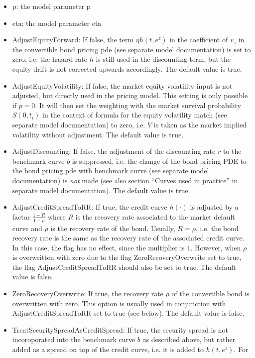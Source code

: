 \begin{itemize}
\item p: the model parameter p
\item eta: the model parameter eta
\item AdjustEquityForward: If false, the term $\eta h(t,e^z)$ in the coefficient of $v_z$ in the convertible bond
  pricing pde (see separate model documentation) is set to zero, i.e. the hazard rate $h$ is still used in the
  discounting term, but the equity drift is not corrected upwards accordingly. The default value is true.
\item AdjustEquityVolatility: If false, the market equity volatility input is not adjusted, but directly used in the
  pricing model. This setting is only possible if $p=0$. It will then set the weighting with the market survival
  probability $S(0,t_i)$ in the context of formula for the equity volatility match (see separate model documentation) to
  zero, i.e. $V$ is taken as the market implied volatility without adjustment. The default value is true.
\item AdjustDiscounting: If false, the adjustment of the discounting rate $r$ to the benchmark curve $b$ is suppressed,
  i.e. the change of the bond pricing PDE to the bond pricing pde with benchmark curve (see separate model
  documentation) is {\em not} made (see also section ``Curves used in practice'' in separate model documentation). The
  default value is true.
\item AdjustCreditSpreadToRR: If true, the credit curve $h(\cdot)$ is adjusted by a factor $\frac{1-R}{1-\rho}$ where
  $R$ is the recovery rate associated to the market default curve and $\rho$ is the recovery rate of the bond. Usually,
  $R=\rho$, i.e. the bond recovery rate is the same as the recovery rate of the associated credit curve. In this case,
  the flag has no effect, since the multiplier is $1$. However, when $\rho$ is overwritten with zero due to the flag
  ZeroRecoveryOverwrite set to true, the flag AdjustCreditSpreadToRR should also be set to true. The default value is
  false.
\item ZeroRecoveryOverwrite: If true, the recovery rate $\rho$ of the convertible bond is overwritten with zero. This
  option is usually used in conjunction with AdjustCreditSpreadToRR set to true (see below). The default value is false.
\item TreatSecuritySpreadAsCreditSpread: If true, the security spread is not incoroporated into the benchmark curve $b$
  as described above, but rather added as a spread on top of the credit curve, i.e. it is added to $h(t,e^z)$. For

\end{itemize}
